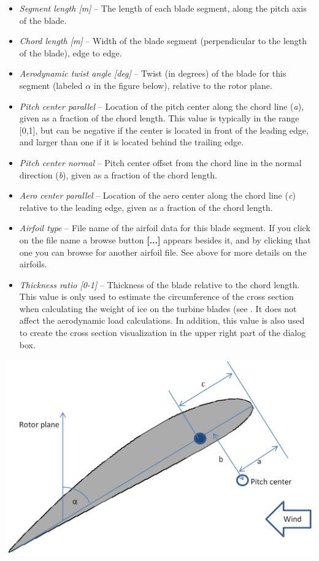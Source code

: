 \begin{itemize}
\item{\sl Segment length [m]} --
  The length of each blade segment, along the pitch axis of the blade.
\item{\sl Chord length [m]} --
  Width of the blade segment (perpendicular to the length of the blade),
  edge to edge.
\item{\sl Aerodynamic twist angle [deg]} --
  Twist (in degrees) of the blade for this segment
  (labeled $\alpha$ in the figure below), relative to the rotor plane.
\item{\sl Pitch center parallel} --
  Location of the pitch center along the chord line ({\sl a}),
  given as a fraction of the chord length.
  This value is typically in the range [0,1], but can be negative if the center
  is located in front of the leading edge, and larger than one if it is located
  behind the trailing edge.
\item{\sl Pitch center normal} --
  Pitch center offset from the chord line in the normal direction ({\sl b}),
  given as a fraction of the chord length.
\item{\sl Aero center parallel} --
  Location of the aero center along the chord line ({\sl c})
  relative to the leading edge, given as a fraction of the chord length.
\item{\sl Airfoil type} --
  File name of the airfoil data for this blade segment.
  If you click on the file name a browse button \textbf{[...]} appears
  besides it, and by clicking that one you can browse for another airfoil file.
  See 
  above for more details on the airfoils.
\clearpage
\item{\sl Thickness ratio [0-1]} --
  Thickness of the blade relative to the chord length.
  This value is only used to estimate the circumference of the cross section
  when calculating the weight of ice on the turbine blades
  (see .
  It does not affect the aerodynamic load calculations.
  In addition, this value is also used to create the cross section visualization
  in the upper right part of the dialog box.
\end{itemize}

\label{blade-profile}{}
\noindent\includegraphics[width=\textwidth]{Figures/3b-BladeDefinition1-fig1}

